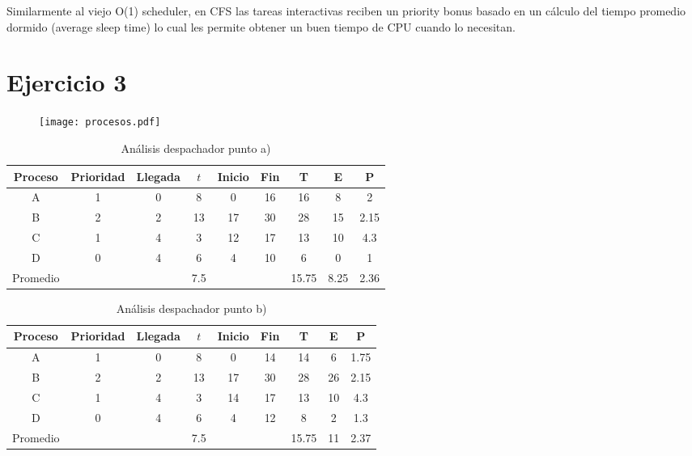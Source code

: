 \documentclass[11pt]{article}
\begin{document}
Similarmente al viejo O(1) scheduler, en CFS las tareas interactivas reciben un
priority bonus basado en un cálculo del tiempo promedio dormido (average sleep
time) lo cual les permite obtener un buen tiempo de CPU cuando lo necesitan.

\newpage
\section*{Ejercicio 3}
\begin{figure}[h!]
  \begin{center}
    \texttt{[image: procesos.pdf]}
  \end{center}
\end{figure}

\begin{table}[h!]
\begin{center}
      \begin{tabular}{|c|c|c|c|c|c|c|c|c|}
          \hline
          Proceso & Prioridad & Llegada & $t$ & Inicio & Fin & T & E & P \\
          \hline
          A & 1 & 0 & 8 & 0 & 16 & 16 & 8 & 2 \\
          \hline
          B & 2 & 2 & 13 & 17 & 30 & 28 & 15 & 2.15 \\
          \hline
          C & 1 & 4 & 3 & 12 & 17 & 13 & 10 & 4.3 \\
          \hline
          D & 0 & 4 & 6 & 4 & 10 & 6 & 0 & 1 \\
          \hline
          Promedio & & & 7.5 & & & 15.75 & 8.25 & 2.36 \\
          \hline
      \end{tabular}
      \caption{Análisis despachador punto a)}
\end{center}
\end{table}

\begin{table}[h!]
\begin{center}
      \begin{tabular}{|c|c|c|c|c|c|c|c|c|}
            \hline
            Proceso & Prioridad & Llegada & $t$ & Inicio & Fin & T & E & P \\
            \hline
            A & 1 & 0 & 8 & 0 & 14 & 14 & 6 & 1.75 \\
            \hline
            B & 2 & 2 & 13 & 17 & 30 & 28 & 26 & 2.15 \\
            \hline
            C & 1 & 4 & 3 & 14 & 17 & 13 & 10 & 4.3 \\
            \hline
            D & 0 & 4 & 6 & 4 & 12 & 8 & 2 & 1.3 \\
            \hline
            Promedio & & & 7.5 & & & 15.75 & 11 & 2.37 \\
            \hline
        \end{tabular}
      \caption{Análisis despachador punto b)}
\end{center}
\end{table}
\end{document}
